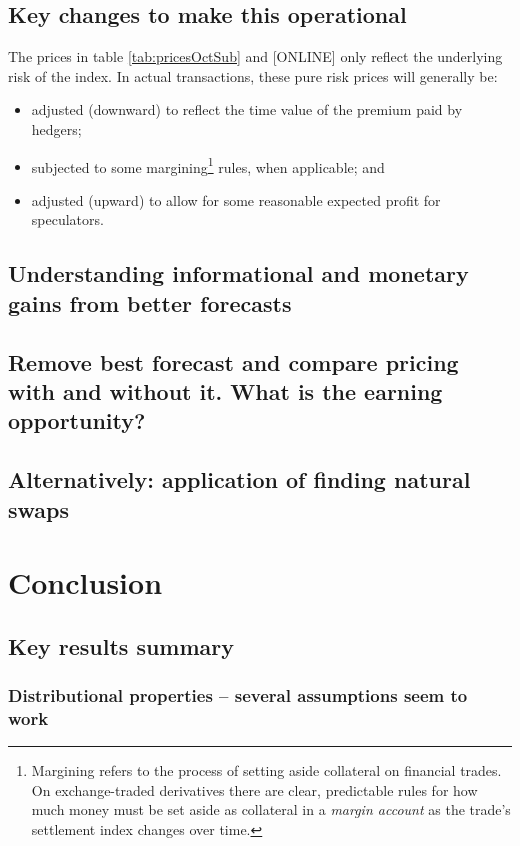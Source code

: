 \documentclass[authoryear]{article}
\begin{document}
\subsection{Key changes to make this operational}
The prices in table \ref{tab:pricesOctSub} and [ONLINE] only reflect the underlying risk of the index. In actual transactions, these pure risk prices will generally be:
\begin{itemize}
\item adjusted (downward) to reflect the time value of the premium paid by hedgers;
\item subjected to some margining\footnote{Margining refers to the process of setting aside collateral on financial trades. On exchange-traded derivatives there are clear, predictable rules for how much money must be set aside as collateral in a \emph{margin account} as the trade's settlement index changes over time.} rules, when applicable; and
\item adjusted (upward) to allow for some reasonable expected profit for speculators.
\end{itemize}

\subsection{Understanding informational and monetary gains from better forecasts}

\subsection{Remove best forecast and compare pricing with and without it. What is the earning opportunity?}

\subsection{Alternatively: application of finding natural swaps}

\section{Conclusion}

\subsection{Key results summary}

\subsubsection{Distributional properties – several assumptions seem to work}
\end{document}
